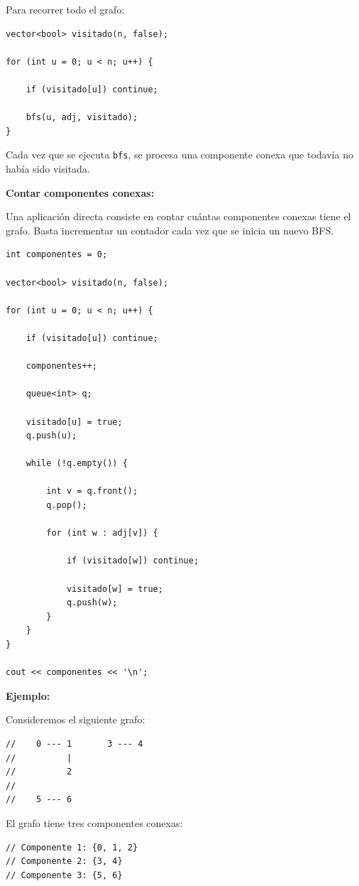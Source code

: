 \documentclass[10pt,a4paper,twocolumn]{article}
\begin{document}
Para recorrer todo el grafo:

\begin{lstlisting}[style=cpp]
vector<bool> visitado(n, false);

for (int u = 0; u < n; u++) {

    if (visitado[u]) continue;

    bfs(u, adj, visitado);
}
\end{lstlisting}

Cada vez que se ejecuta \texttt{bfs}, se procesa una componente conexa
que todavía no había sido visitada.

\textbf{Contar componentes conexas:}

Una aplicación directa consiste en contar cuántas componentes conexas
tiene el grafo. Basta incrementar un contador cada vez que se inicia
un nuevo BFS.

\begin{lstlisting}[style=cpp]
int componentes = 0;

vector<bool> visitado(n, false);

for (int u = 0; u < n; u++) {

    if (visitado[u]) continue;

    componentes++;

    queue<int> q;

    visitado[u] = true;
    q.push(u);

    while (!q.empty()) {

        int v = q.front();
        q.pop();

        for (int w : adj[v]) {

            if (visitado[w]) continue;

            visitado[w] = true;
            q.push(w);
        }
    }
}

cout << componentes << '\n';
\end{lstlisting}

\textbf{Ejemplo:}

Consideremos el siguiente grafo:

\begin{lstlisting}[style=cpp]
//    0 --- 1       3 --- 4
//          |
//          2
//
//    5 --- 6
\end{lstlisting}

El grafo tiene tres componentes conexas:

\begin{lstlisting}[style=cpp]
// Componente 1: {0, 1, 2}
// Componente 2: {3, 4}
// Componente 3: {5, 6}
\end{lstlisting}
\end{document}
